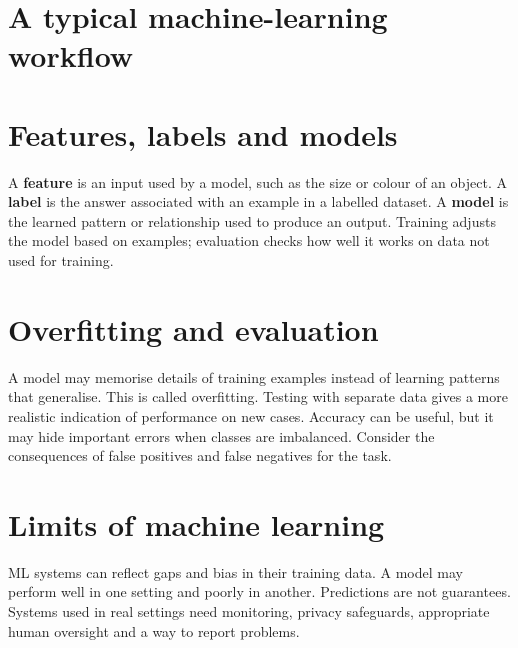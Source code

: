\documentclass[11pt,openany,oneside]{book}
\newcommand{\keyterm}[1]{\textbf{\color{Navy}#1}}
\begin{document}
\section{A typical machine-learning workflow}
\begin{center}
\end{center}

\section{Features, labels and models}
A \keyterm{feature} is an input used by a model, such as the size or colour of an object. A \keyterm{label} is the answer associated with an example in a labelled dataset. A \keyterm{model} is the learned pattern or relationship used to produce an output. Training adjusts the model based on examples; evaluation checks how well it works on data not used for training.

\section{Overfitting and evaluation}
A model may memorise details of training examples instead of learning patterns that generalise. This is called overfitting. Testing with separate data gives a more realistic indication of performance on new cases. Accuracy can be useful, but it may hide important errors when classes are imbalanced. Consider the consequences of false positives and false negatives for the task.

\section{Limits of machine learning}
ML systems can reflect gaps and bias in their training data. A model may perform well in one setting and poorly in another. Predictions are not guarantees. Systems used in real settings need monitoring, privacy safeguards, appropriate human oversight and a way to report problems.
\end{document}
